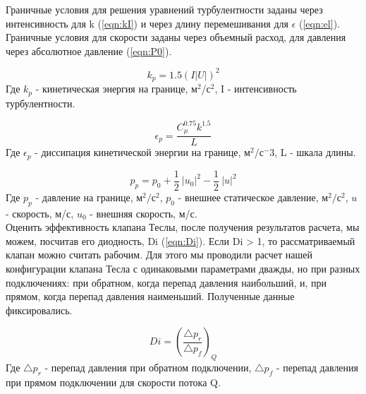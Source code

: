 \documentclass[10pt,a4paper]{book}
\begin{document}
%        
        
        Граничные условия для решения уравнений турбулентности заданы через интенсивность для k (\ref{eqn:kI}) и через длину перемешивания для $\epsilon$ (\ref{eqn:el}). Граничные условия для скорости заданы через объемный расход, для давления через абсолютное давление (\ref{eqn:P0}).
        
        \begin{equation}\label{eqn:kI}
            k_{p} = 1.5 (I |U|)^2
        \end{equation}
        Где $k_{p}$ - кинетическая энергия на границе, м$^2$/с$^2$, I - интенсивность турбулентности.
        
        \begin{equation}\label{eqn:el}
            \epsilon_{p} = \frac{C_{\mu}^{0.75} k^{1.5}}{L}           
        \end{equation}
        Где $\epsilon_{p}$ - диссипация кинетической энергии на границе, м$^2$/с$^-3$, L - шкала длины.
        
        \begin{equation}\label{eqn:P0}
            p_{p} = p_{0} + \frac{1}{2}\ \left|u_{0}\right|^2 - \frac{1}{2}\ \left|u\right|^2
        \end{equation}
        Где $p_{p}$ - давление на границе, м$^{2}/$с$^{2}$, $p_{0}$ - внешнее статическое давление, м$^{2}/$с$^{2}$, $u$ - скорость, м/с, $u_{0}$ - внешняя скорость, м/с.\\
        
        Оценить эффективность клапана Теслы, после получения результатов расчета, мы можем, посчитав его диодность, Di (\ref{eqn:Di}). Если Di > 1, то рассматриваемый клапан можно считать рабочим. Для этого мы проводили расчет нашей конфигурации клапана Тесла с одинаковыми параметрами дважды, но при разных подключениях: при обратном, когда перепад давления наибольший, и, при прямом, когда перепад давления наименьший. Полученные данные фиксировались.         
        
        \begin{equation}\label{eqn:Di}
            Di = (\frac{\bigtriangleup p_{r}}{\bigtriangleup p_{f}})_Q
        \end{equation}
        Где $\bigtriangleup p_{r}$ - перепад давления при обратном подключении, $\bigtriangleup p_{f}$ - перепад давления при прямом подключении для скорости потока Q.
        
\end{document}
